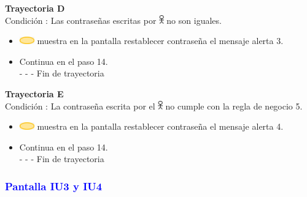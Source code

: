 \textbf{Trayectoria D}\\
Condición : Las contraseñas escritas por \includegraphics[width=0.0150\textwidth]{Figuras/persona.png} no son iguales.
\begin{itemize}
    \item  \includegraphics[width=0.0500\textwidth]{Figuras/sistema.png} muestra en la pantalla restablecer contraseña el mensaje alerta 3.
    \item Continua en el paso 14.\\
    - - - Fin de trayectoria
\end{itemize}
\textbf{Trayectoria E}\\
Condición : La contraseña escrita por el \includegraphics[width=0.0150\textwidth]{Figuras/persona.png} no cumple con la regla de negocio 5.
\begin{itemize}
    \item \includegraphics[width=0.0500\textwidth]{Figuras/sistema.png} muestra en la pantalla restablecer contraseña el mensaje alerta 4.
    \item Continua en el paso 14.\\
    - - - Fin de trayectoria
\end{itemize}
\subsubsection{\textcolor{blue}{Pantalla IU3 y IU4}}

